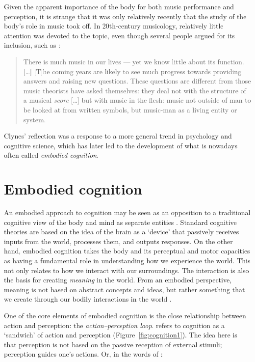 Given the apparent importance of the body for both music performance and perception, it is strange that it was only relatively recently that the study of the body's role in music took off. In 20th-century musicology, relatively little attention was devoted to the topic, even though several people argued for its inclusion, such as \citet[vii]{clynes_music_1982}:

\begin{quote}
There is much music in our lives --- yet we know little about its function. [\ldots] [T]he coming years are likely to see much progress towards providing answers and raising new questions. These questions are different from those music theorists have asked themselves: they deal not with the structure of a musical \emph{score} [\ldots] but with music in the flesh: music not outside of man to be looked at from written symbols, but music-man as a living entity or system.
\end{quote}

Clynes' reflection was a response to a more general trend in psychology and cognitive science, which has later led to the development of what is nowadays often called \emph{embodied cognition}.


\section{Embodied cognition}

An embodied approach to cognition may be seen as an opposition to a traditional cognitive view of the body and mind as separate entities \citep{shapiro_embodied_2019}. Standard cognitive theories are based on the idea of the brain as a `device' that passively receives inputs from the world, processes them, and outputs responses. On the other hand, embodied cognition takes the body and its perceptual and motor capacities as having a fundamental role in understanding how we experience the world. This not only relates to how we interact with our surroundings. The interaction is also the basis for creating \emph{meaning} in the world. From an embodied perspective, meaning is not based on abstract concepts and ideas, but rather something that we create through our bodily interactions in the world  \citep{dourish_where_2001}.

One of the core elements of embodied cognition is the close relationship between action and perception: the \emph{action--perception loop}. \citet{hurley_consciousness_1998} refers to cognition as a `sandwich' of action and perception (Figure~\ref{fig:cognition1}). The idea here is that perception is not based on the passive reception of external stimuli; perception guides one's actions. Or, in the words of \citet[p. 1]{noe_action_2004}:

